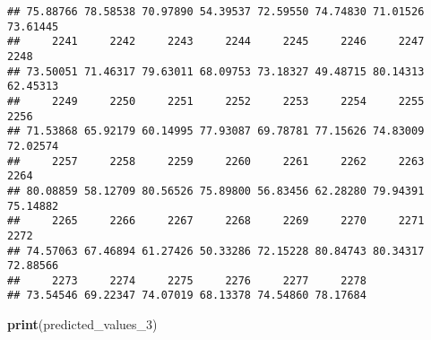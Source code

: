 \documentclass[
]{article}
\newenvironment{Shaded}{\begin{snugshade}}{\end{snugshade}}
\newcommand{\FunctionTok}[1]{\textcolor[rgb]{0.13,0.29,0.53}{\textbf{#1}}}
\newcommand{\NormalTok}[1]{#1}
\begin{document}
\begin{verbatim}
## 75.88766 78.58538 70.97890 54.39537 72.59550 74.74830 71.01526 73.61445 
##     2241     2242     2243     2244     2245     2246     2247     2248 
## 73.50051 71.46317 79.63011 68.09753 73.18327 49.48715 80.14313 62.45313 
##     2249     2250     2251     2252     2253     2254     2255     2256 
## 71.53868 65.92179 60.14995 77.93087 69.78781 77.15626 74.83009 72.02574 
##     2257     2258     2259     2260     2261     2262     2263     2264 
## 80.08859 58.12709 80.56526 75.89800 56.83456 62.28280 79.94391 75.14882 
##     2265     2266     2267     2268     2269     2270     2271     2272 
## 74.57063 67.46894 61.27426 50.33286 72.15228 80.84743 80.34317 72.88566 
##     2273     2274     2275     2276     2277     2278 
## 73.54546 69.22347 74.07019 68.13378 74.54860 78.17684
\end{verbatim}

\begin{Shaded}
\begin{Highlighting}[]
\FunctionTok{print}\NormalTok{(predicted\_values\_3)}
\end{Highlighting}
\end{Shaded}
\end{document}
